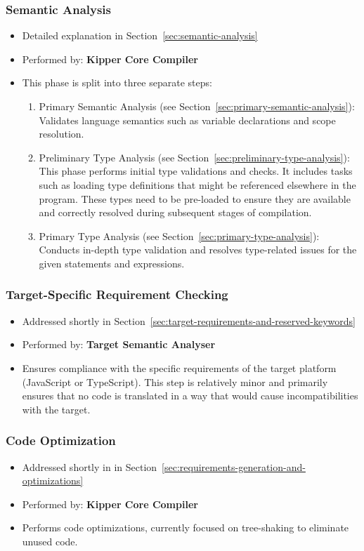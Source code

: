 \subsubsection{Semantic Analysis}
\begin{itemize}
	\item Detailed explanation in Section~\ref{sec:semantic-analysis}
	\item Performed by: \textbf{Kipper Core Compiler}
	\item This phase is split into three separate steps:
	\begin{enumerate}
		\item Primary Semantic Analysis (see Section~\ref{sec:primary-semantic-analysis}): Validates language semantics such as variable declarations and scope resolution.
		\item Preliminary Type Analysis (see Section~\ref{sec:preliminary-type-analysis}): This phase performs initial type validations and checks. It includes tasks such as loading type definitions that might be referenced elsewhere in the program. These types need to be pre-loaded to ensure they are available and correctly resolved during subsequent stages of compilation.
		\item Primary Type Analysis (see Section~\ref{sec:primary-type-analysis}): Conducts in-depth type validation and resolves type-related issues for the given statements and expressions.
	\end{enumerate}
\end{itemize}

\subsubsection{Target-Specific Requirement Checking}
\begin{itemize}
	\item Addressed shortly in Section~\ref{sec:target-requirements-and-reserved-keywords}
	\item Performed by: \textbf{Target Semantic Analyser}
	\item Ensures compliance with the specific requirements of the target platform (JavaScript or TypeScript). This step is relatively minor and primarily ensures that no code is translated in a way that would cause incompatibilities with the target.
\end{itemize}

\subsubsection{Code Optimization}
\begin{itemize}
	\item Addressed shortly in in Section~\ref{sec:requirements-generation-and-optimizations}
	\item Performed by: \textbf{Kipper Core Compiler}
	\item Performs code optimizations, currently focused on tree-shaking to eliminate unused code.
\end{itemize}

